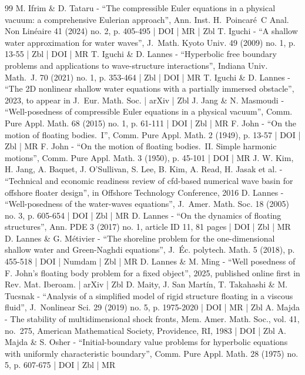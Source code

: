 \documentclass[10pt]{amsart}
\theoremstyle{definition}
\begin{document}
\begin{thebibliography}{99}
M. Ifrim \& D. Tataru - “The compressible Euler equations in a physical vacuum: a comprehensive Eulerian approach”, Ann. Inst. H. Poincaré C Anal. Non Linéaire 41 (2024) no. 2, p. 405-495 | DOI | MR | Zbl
T. Iguchi - “A shallow water approximation for water waves”, J. Math. Kyoto Univ. 49 (2009) no. 1, p. 13-55 | Zbl | DOI | MR
T. Iguchi \& D. Lannes - “Hyperbolic free boundary problems and applications to wave-structure interactions”, Indiana Univ. Math. J. 70 (2021) no. 1, p. 353-464 | Zbl | DOI | MR
T. Iguchi \& D. Lannes - “The 2D nonlinear shallow water equations with a partially immersed obstacle”, 2023, to appear in J. Eur. Math. Soc. | arXiv | Zbl
J. Jang \& N. Masmoudi - “Well-posedness of compressible Euler equations in a physical vacuum”, Comm. Pure Appl. Math. 68 (2015) no. 1, p. 61-111 | DOI | Zbl | MR
F. John - “On the motion of floating bodies. I”, Comm. Pure Appl. Math. 2 (1949), p. 13-57 | DOI | Zbl | MR
F. John - “On the motion of floating bodies. II. Simple harmonic motions”, Comm. Pure Appl. Math. 3 (1950), p. 45-101 | DOI | MR
J. W. Kim, H. Jang, A. Baquet, J. O’Sullivan, S. Lee, B. Kim, A. Read, H. Jasak et al. - “Technical and economic readiness review of cfd-based numerical wave basin for offshore floater design”, in Offshore Technology Conference, 2016
D. Lannes - “Well-posedness of the water-waves equations”, J. Amer. Math. Soc. 18 (2005) no. 3, p. 605-654 | DOI | Zbl | MR
D. Lannes - “On the dynamics of floating structures”, Ann. PDE 3 (2017) no. 1, article ID 11, 81 pages | DOI | Zbl | MR
D. Lannes \& G. Métivier - “The shoreline problem for the one-dimensional shallow water and Green-Naghdi equations”, J. Éc. polytech. Math. 5 (2018), p. 455-518 | DOI | Numdam | Zbl | MR
D. Lannes \& M. Ming - “Well posedness of F. John’s floating body problem for a fixed object”, 2025, published online first in Rev. Mat. Iberoam. | arXiv | Zbl
D. Maity, J. San Martín, T. Takahashi \& M. Tucsnak - “Analysis of a simplified model of rigid structure floating in a viscous fluid”, J. Nonlinear Sci. 29 (2019) no. 5, p. 1975-2020 | DOI | MR | Zbl
A. Majda - The stability of multidimensional shock fronts, Mem. Amer. Math. Soc., vol. 41, no. 275, American Mathematical Society, Providence, RI, 1983 | DOI | Zbl
A. Majda \& S. Osher - “Initial-boundary value problems for hyperbolic equations with uniformly characteristic boundary”, Comm. Pure Appl. Math. 28 (1975) no. 5, p. 607-675 | DOI | Zbl | MR

\end{thebibliography}
\end{document}
